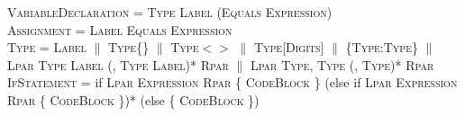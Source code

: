 \documentclass{article}
\begin{document}
\textsc{VariableDeclaration} = \textsc{Type} \textsc{Label} (\textsc{Equals} \textsc{Expression}) \\

\textsc{Assignment} = \textsc{Label} \textsc{Equals} \textsc{Expression} \\

\textsc{Type} = \textsc{Label} $\|$ \textsc{Type}\{\} $\|$ \textsc{Type}$<>$ $\|$ \textsc{Type}[\textsc{Digits}] $\|$ \{\textsc{Type}:\textsc{Type}\} $\|$ \textsc{Lpar} \textsc{Type} \textsc{Label} (, \textsc{Type} \textsc{Label})* \textsc{Rpar} $\|$ \textsc{Lpar} \textsc{Type}, \textsc{Type} (, \textsc{Type})* \textsc{Rpar} \\

\textsc{IfStatement} = if \textsc{Lpar} \textsc{Expression} \textsc{Rpar} \{ \textsc{CodeBlock} \} (else if \textsc{Lpar} \textsc{Expression} \textsc{Rpar} \{ \textsc{CodeBlock} \})* (else \{ \textsc{CodeBlock} \}) 
\end{document}
